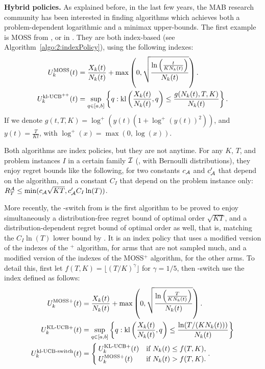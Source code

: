 \textbf{Hybrid policies.}
%
As explained before, in the last few years, the MAB research community has been interested in finding algorithms which achieves both a problem-dependent logarithmic and a minimax upper-bounds.
The first example is MOSS from \cite{Audibert2009minimax}, or \KLUCBpp{} in \cite{Menard17}.
They are both index-based (see Algorithm~\ref{algo:2:indexPolicy}), using the following indexes:
\begin{align}\label{eq:2:indexes_for_MOSS_klUCBpp}
    U^{\mathrm{MOSS}}_k(t) &= \frac{X_k(t)}{N_k(t)} + \max\left(0, \sqrt{ \frac{\ln\left(\frac{t}{K N_k(t)}\right)}{N_k(t)} } \right). \\
    U^{\mathrm{kl}\text{-}\mathrm{UCB}^{++}}_k(t) &= \sup\limits_{q \in [a, b]} \left\{ q : \mathrm{kl}\left(\frac{X_k(t)}{N_k(t)}, q\right) \leq \frac{g(N_k(t), T, K)}{N_k(t)} \right\}.
\end{align}
%
If we denote $g(t, T, K) = \log^+(y(t) (1 + \log^+(y(t))^2))$, and $y(t) = \frac{T}{K t}$, with $\log^+(x) = \max(0, \log(x))$.

Both algorithms are index policies, but they are not anytime.
For any $K$, $T$, and problem instances $I$ in a certain family $\mathcal{I}$ (\eg, with Bernoulli distributions),
they enjoy regret bounds like the following, for two constants $c_{\mathcal{A}}$ and $c'_{\mathcal{A}}$ that depend on the algorithm, and a constant $C_I$ that depend on the problem instance only: $R_T^{\mathcal{A}} \leq \min( c_{\mathcal{A}} \sqrt{K T}, c'_{\mathcal{A}} C_I \ln(T))$.

More recently, the \klUCB-switch from \cite{Garivier18} is the first algorithm to be proved to
enjoy simultaneously a distribution-free regret bound of optimal order $\sqrt{KT}$, and a distribution-dependent regret bound of optimal order as well, that is, matching the $C_I \ln(T)$ lower bound by \cite{LaiRobbins85}.
It is an index policy that uses a modified version of the indexes of the \klUCB$^+$ algorithm, for arms that are not sampled much, and a modified version of the indexes of the MOSS$^+$ algorithm, for the other arms.
To detail this, first let $f(T, K) = \lfloor (T/K)^{\gamma}\rfloor$ for $\gamma=1/5$,
then \klUCB-switch use the index defined as follows:
%
\begin{align}\label{eq:2:indexes_for_klUCBswitch}
    U^{\mathrm{MOSS}+}_k(t) &= \frac{X_k(t)}{N_k(t)} + \max\left(0, \sqrt{ \frac{\ln\left(\frac{T}{K N_k(t)}\right)}{N_k(t)}} \right). \\
    U^{\mathrm{KL}\text{-}\mathrm{UCB}+}_k(t) &= \sup\limits_{q \in [a, b]} \left\{ q : \mathrm{kl}\left(\frac{X_k(t)}{N_k(t)}, q\right) \leq \frac{\ln(T / (K N_k(t)))}{N_k(t)} \right\} \\
    U^{\mathrm{kl}\text{-}\mathrm{UCB}\text{-}\mathrm{switch}}_k(t) &= \begin{cases}
        U^{\mathrm{KL}\text{-}\mathrm{UCB}+}_k(t) & \text{if } N_k(t) \leq f(T, K), \\
        U^{\mathrm{MOSS}+}_k(t) & \text{if } N_k(t) > f(T, K).
    \end{cases}.
\end{align}

